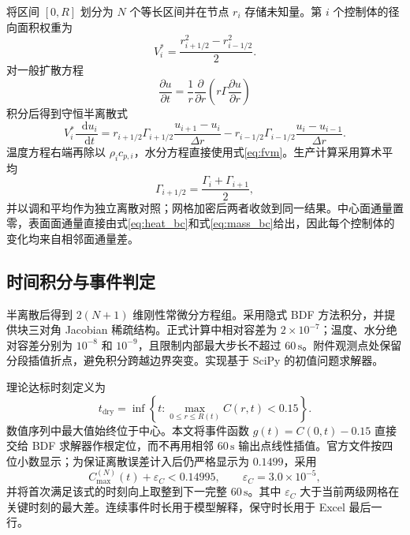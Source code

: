 \documentclass[UTF8,a4paper,zihao=-4,fontset=fandol]{ctexart}
\newcommand{\unit}[1]{\,\mathrm{#1}}
\newcommand{\dif}{\mathop{}\!\mathrm{d}}
\begin{document}
将区间 $[0,R]$ 划分为 $N$ 个等长区间并在节点 $r_i$ 存储未知量。第 $i$ 个控制体的径向面积权重为
\begin{equation}
V_i^{\ast}=\frac{r_{i+1/2}^2-r_{i-1/2}^2}{2}.
\label{eq:volume}
\end{equation}
对一般扩散方程
\begin{equation}
\frac{\partial u}{\partial t}
=\frac{1}{r}\frac{\partial}{\partial r}
\left(r\Gamma\frac{\partial u}{\partial r}\right)
\end{equation}
积分后得到守恒半离散式\cite{patankar1980}
\begin{equation}
V_i^{\ast}\frac{\dif u_i}{\dif t}
=r_{i+1/2}\Gamma_{i+1/2}\frac{u_{i+1}-u_i}{\Delta r}
-r_{i-1/2}\Gamma_{i-1/2}\frac{u_i-u_{i-1}}{\Delta r}.
\label{eq:fvm}
\end{equation}
温度方程右端再除以 $\rho_i c_{p,i}$，水分方程直接使用式\eqref{eq:fvm}。生产计算采用算术平均
\begin{equation}
\Gamma_{i+1/2}=\frac{\Gamma_i+\Gamma_{i+1}}{2},
\label{eq:hmean}
\end{equation}
并以调和平均作为独立离散对照；网格加密后两者收敛到同一结果。中心面通量置零，表面面通量直接由式\eqref{eq:heat_bc}和式\eqref{eq:mass_bc}给出，因此每个控制体的变化均来自相邻面通量差。

\subsection{时间积分与事件判定}

半离散后得到 $2(N+1)$ 维刚性常微分方程组。采用隐式 BDF 方法积分\cite{hairer1996}，并提供块三对角 Jacobian 稀疏结构。正式计算中相对容差为 $2\times10^{-7}$；温度、水分绝对容差分别为 $10^{-8}$ 和 $10^{-9}$，且限制内部最大步长不超过 $60\unit{s}$。附件观测点处保留分段插值折点，避免积分跨越边界突变。实现基于 SciPy 的初值问题求解器\cite{virtanen2020}。

理论达标时刻定义为
\begin{equation}
t_{\mathrm{dry}}=\inf\left\{t:\max_{0\le r\le R(t)}C(r,t)<0.15\right\}.
\label{eq:drytime}
\end{equation}
数值序列中最大值始终位于中心。本文将事件函数 $g(t)=C(0,t)-0.15$ 直接交给 BDF 求解器作根定位，而不再用相邻 $60\unit{s}$ 输出点线性插值。官方文件按四位小数显示；为保证离散误差计入后仍严格显示为 $0.1499$，采用
\begin{equation}
C_{\max}^{(N)}(t)+\varepsilon_C<0.14995,
\qquad \varepsilon_C=3.0\times10^{-5},
\label{eq:display_safe}
\end{equation}
并将首次满足该式的时刻向上取整到下一完整 $60\unit{s}$。其中 $\varepsilon_C$ 大于当前两级网格在关键时刻的最大差。连续事件时长用于模型解释，保守时长用于 Excel 最后一行。
\end{document}
